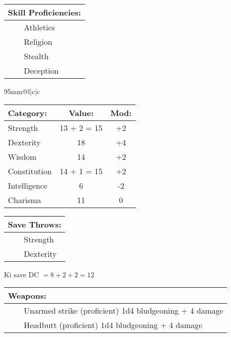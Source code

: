 \documentclass[11pt]{article}
\newcommand{\tabitem}{~~\llap{--}~~}
\begin{document}
\begin{multicols}{2}
\vspace{2mm}

\noindent \begin{tabularx}{95mm}{@{}l}
{\Large \textbf{Skill Proficiencies:}} \\
\hline
\tabitem Athletics \\
\tabitem Religion \\
\tabitem Stealth \\
\tabitem Deception
		\end{tabularx}

\vspace{4mm}

\noindent \begin{tabularx}{95mm}{@{}l|c|c}
 \\
\hline
		\end{tabularx}
\noindent \begin{tabular}{@{}l|c|c}
\textbf{Category:} 			& \textbf{Value:} 	& \textbf{Mod:} \\
\hline
Strength 					& 13 + 2 = 15		& +2		\\
Dexterity 					& 18 				& +4		\\
Wisdom 						& 14				& +2		\\
Constitution 				& 14 + 1 = 15		& +2		\\
Intelligence 				& 6 				& -2		\\
Charisma 					& 11 				& 0
		\end{tabular}

\vspace{4mm}

\noindent \begin{tabularx}{95mm}{@{}l}
{\Large \textbf{Save Throws:}} \\
\hline
\tabitem Strength \\
\tabitem Dexterity \\
		\end{tabularx}
\noindent Ki save DC $= 8 + 2 + 2 = 12$

\vspace{4mm}

\noindent \begin{tabularx}{95mm}{@{}l}
{\Large \textbf{Weapons:}} \\
\hline
\tabitem Unarmed strike (proficient) 1d4 bludgeoning + 4 damage \\
\tabitem Headbutt (proficient) 1d4 bludgeoning + 4 damage
		\end{tabularx}


\end{multicols}
\end{document}
